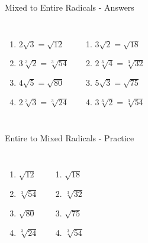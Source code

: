 \documentclass[aspectratio=169]{beamer}
\begin{document}
\begin{frame}{Mixed to Entire Radicals - Answers}
\begin{tcolorbox}[colback=lightgray,colframe=primary,title=Solutions]
\footnotesize
\begin{columns}[T]
\begin{enumerate}
  \item $2\sqrt{3} = \sqrt{12}$
  \item $3\sqrt[3]{2} = \sqrt[3]{54}$
  \item $4\sqrt{5} = \sqrt{80}$
  \item $2\sqrt[3]{3} = \sqrt[3]{24}$
\end{enumerate}
\begin{enumerate}
  \item $3\sqrt{2} = \sqrt{18}$
  \item $2\sqrt[3]{4} = \sqrt[3]{32}$
  \item $5\sqrt{3} = \sqrt{75}$
  \item $3\sqrt[3]{2} = \sqrt[3]{54}$
\end{enumerate}
\end{columns}
\end{tcolorbox}
\end{frame}

\begin{frame}{Entire to Mixed Radicals - Practice}
\begin{tcolorbox}[colback=lightgray,colframe=accent,title=Practice Problems]
\footnotesize
\begin{columns}[T]
\begin{enumerate}
  \item $\sqrt{12}$
  \item $\sqrt[3]{54}$
  \item $\sqrt{80}$
  \item $\sqrt[3]{24}$
\end{enumerate}
\begin{enumerate}
  \item $\sqrt{18}$
  \item $\sqrt[3]{32}$
  \item $\sqrt{75}$
  \item $\sqrt[3]{54}$
\end{enumerate}
\end{columns}
\end{tcolorbox}
\end{frame}
\end{document}
